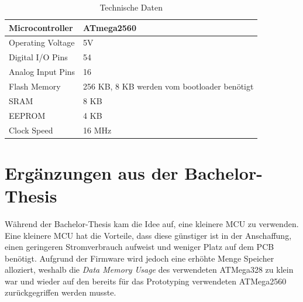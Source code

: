 \begin{table}[h]
\centering
\caption{Technische Daten \cite[S.3]{arduinoMega}}
\begin{tabular}{|l|l|}
\hline 
Microcontroller & ATmega2560 \\ 
\hline 
Operating Voltage & 5V \\ 
\hline 
Digital I/O Pins & 54  \\ 
\hline 
Analog Input Pins & 16 \\ 
\hline 
Flash Memory & 256 KB, 8 KB werden vom bootloader benötigt\\ 
\hline 
SRAM & 8 KB \\ 
\hline 
EEPROM & 4 KB \\ 
\hline 
Clock Speed & 16 MHz \\ 
\hline 
\end{tabular}
\label{tab:arduinoMega_technischeDaten}
\end{table}

\section{Ergänzungen aus der Bachelor-Thesis}
Während der Bachelor-Thesis kam die Idee auf, eine kleinere MCU zu verwenden. Eine kleinere MCU hat die Vorteile, dass diese günstiger ist in der Anschaffung, einen geringeren Stromverbrauch aufweist und weniger Platz auf dem PCB benötigt.  Aufgrund der Firmware wird jedoch eine erhöhte Menge Speicher alloziert, weshalb die \textit{Data Memory Usage} des verwendeten ATMega328 zu klein war und wieder auf den bereits für das Prototyping verwendeten ATMega2560 zurückgegriffen werden musste. \\

